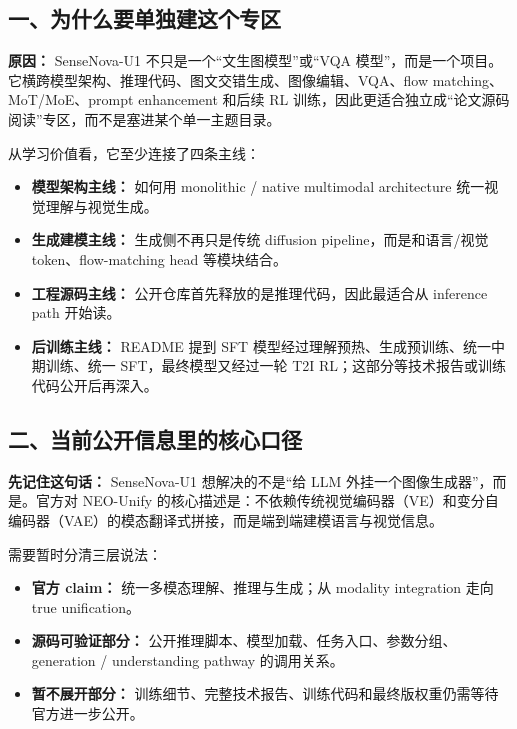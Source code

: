 \subsection{一、为什么要单独建这个专区}

\begin{conceptbox}
\textbf{原因：} SenseNova-U1 不只是一个“文生图模型”或“VQA 模型”，而是一个项目。它横跨模型架构、推理代码、图文交错生成、图像编辑、VQA、flow matching、MoT/MoE、prompt enhancement 和后续 RL 训练，因此更适合独立成“论文源码阅读”专区，而不是塞进某个单一主题目录。
\end{conceptbox}

从学习价值看，它至少连接了四条主线：
\begin{itemize}[leftmargin=1.5em]
  \item \textbf{模型架构主线：} 如何用 monolithic / native multimodal architecture 统一视觉理解与视觉生成。
  \item \textbf{生成建模主线：} 生成侧不再只是传统 diffusion pipeline，而是和语言/视觉 token、flow-matching head 等模块结合。
  \item \textbf{工程源码主线：} 公开仓库首先释放的是推理代码，因此最适合从 inference path 开始读。
  \item \textbf{后训练主线：} README 提到 SFT 模型经过理解预热、生成预训练、统一中期训练、统一 SFT，最终模型又经过一轮 T2I RL；这部分等技术报告或训练代码公开后再深入。
\end{itemize}

\subsection{二、当前公开信息里的核心口径}

\begin{summarybox}
\textbf{先记住这句话：} SenseNova-U1 想解决的不是“给 LLM 外挂一个图像生成器”，而是。官方对 NEO-Unify 的核心描述是：不依赖传统视觉编码器（VE）和变分自编码器（VAE）的模态翻译式拼接，而是端到端建模语言与视觉信息。
\end{summarybox}

需要暂时分清三层说法：
\begin{itemize}[leftmargin=1.5em]
  \item \textbf{官方 claim：} 统一多模态理解、推理与生成；从 modality integration 走向 true unification。
  \item \textbf{源码可验证部分：} 公开推理脚本、模型加载、任务入口、参数分组、generation / understanding pathway 的调用关系。
  \item \textbf{暂不展开部分：} 训练细节、完整技术报告、训练代码和最终版权重仍需等待官方进一步公开。
\end{itemize}

